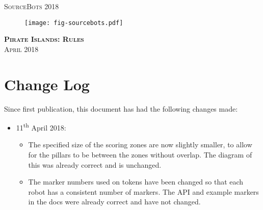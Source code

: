 \documentclass[twoside,12pt,a4paper,titlepage]{article}
\title{\gamename}
\author{\org}
\date{\timeline}
\newcommand{\gamename}{Pirate Islands\xspace}
\newcommand{\timeline}{April 2018\xspace}
\begin{document}
\begin{titlepage}
\begin{center}
\textsc{\large SourceBots 2018}\\[3.5cm]
\begin{figure}
    \centering
    \texttt{[image: fig-sourcebots.pdf]}
\end{figure}
\textsc{\huge \textbf{\gamename{}: Rules}}\\[1cm]
\textsc{\large \timeline}\\[3cm]
\end{center}
\end{titlepage}


\clearpage

\clearpage

\clearpage

\section{Change Log}

Since first publication, this document has had the following changes made:

\begin{itemize}
    \item 11\textsuperscript{th} April 2018:
    \begin{itemize}
        \item The specified size of the scoring zones are now slightly smaller,
              to allow for the pillars to be between the zones without overlap.
              The diagram of this was already correct and is unchanged.
        \item The marker numbers used on tokens have been changed so that each
              robot has a consistent number of markers. The API and example
              markers in the docs were already correct and have not changed.
    \end{itemize}
\end{itemize}
\end{document}
